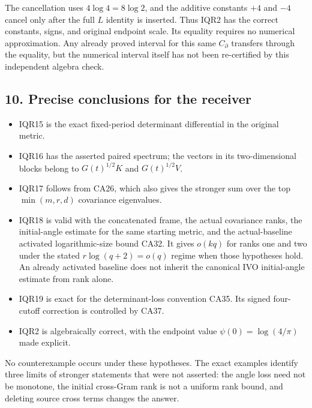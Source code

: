 The cancellation uses \(4\log4=8\log2\), and the additive constants \(+4\) and \(-4\) cancel only after the full \(L\) identity is inserted. Thus IQR2 has the correct constants, signs, and original endpoint scale. Its equality requires no numerical approximation. Any already proved interval for this same \(C_\partial\) transfers through the equality, but the numerical interval itself has not been re-certified by this independent algebra check.

\subsection{10. Precise conclusions for the receiver}\label{precise-conclusions-for-the-receiver}

\begin{itemize}
\tightlist
\item
  IQR15 is the exact fixed-period determinant differential in the original metric.
\item
  IQR16 has the asserted paired spectrum; the vectors in its two-dimensional blocks belong to \(G(t)^{1/2}K\) and \(G(t)^{1/2}V\).
\item
  IQR17 follows from CA26, which also gives the stronger sum over the top \(\min(m,r,d)\) covariance eigenvalues.
\item
  IQR18 is valid with the concatenated frame, the actual covariance ranks, the initial-angle estimate for the same starting metric, and the actual-baseline activated logarithmic-size bound CA32. It gives \(o(kq)\) for ranks one and two under the stated \(r\log(q+2)=o(q)\) regime when those hypotheses hold. An already activated baseline does not inherit the canonical IVO initial-angle estimate from rank alone.
\item
  IQR19 is exact for the determinant-loss convention CA35. Its signed four-cutoff correction is controlled by CA37.
\item
  IQR2 is algebraically correct, with the endpoint value \(\psi(0)=\log(4/\pi)\) made explicit.
\end{itemize}

No counterexample occurs under these hypotheses. The exact examples identify three limits of stronger statements that were not asserted: the angle loss need not be monotone, the initial cross-Gram rank is not a uniform rank bound, and deleting source cross terms changes the answer.

